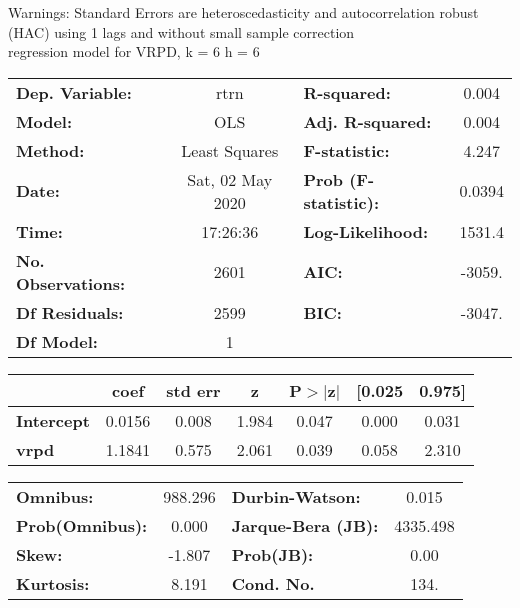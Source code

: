 Warnings: \newline
 [1] Standard Errors are heteroscedasticity and autocorrelation robust (HAC) using 1 lags and without small sample correction\\ 

regression model for VRPD, k = 6 h = 6\begin{center}
\begin{tabular}{lclc}
\toprule
\textbf{Dep. Variable:}    &       rtrn       & \textbf{  R-squared:         } &     0.004   \\
\textbf{Model:}            &       OLS        & \textbf{  Adj. R-squared:    } &     0.004   \\
\textbf{Method:}           &  Least Squares   & \textbf{  F-statistic:       } &     4.247   \\
\textbf{Date:}             & Sat, 02 May 2020 & \textbf{  Prob (F-statistic):} &   0.0394    \\
\textbf{Time:}             &     17:26:36     & \textbf{  Log-Likelihood:    } &    1531.4   \\
\textbf{No. Observations:} &        2601      & \textbf{  AIC:               } &    -3059.   \\
\textbf{Df Residuals:}     &        2599      & \textbf{  BIC:               } &    -3047.   \\
\textbf{Df Model:}         &           1      & \textbf{                     } &             \\
\bottomrule
\end{tabular}
\begin{tabular}{lcccccc}
                   & \textbf{coef} & \textbf{std err} & \textbf{z} & \textbf{P$> |$z$|$} & \textbf{[0.025} & \textbf{0.975]}  \\
\midrule
\textbf{Intercept} &       0.0156  &        0.008     &     1.984  &         0.047        &        0.000    &        0.031     \\
\textbf{vrpd}      &       1.1841  &        0.575     &     2.061  &         0.039        &        0.058    &        2.310     \\
\bottomrule
\end{tabular}
\begin{tabular}{lclc}
\textbf{Omnibus:}       & 988.296 & \textbf{  Durbin-Watson:     } &    0.015  \\
\textbf{Prob(Omnibus):} &   0.000 & \textbf{  Jarque-Bera (JB):  } & 4335.498  \\
\textbf{Skew:}          &  -1.807 & \textbf{  Prob(JB):          } &     0.00  \\
\textbf{Kurtosis:}      &   8.191 & \textbf{  Cond. No.          } &     134.  \\
\bottomrule
\end{tabular}
\end{center}

